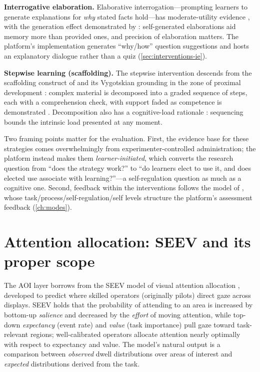 \textbf{Interrogative elaboration.} Elaborative interrogation---prompting
learners to generate explanations for \emph{why} stated facts hold---has
moderate-utility evidence \citep{dunlosky2013}, with the generation effect
demonstrated by \citet{pressley1987}: self-generated elaborations aid
memory more than provided ones, and precision of elaboration matters. The
platform's implementation generates ``why/how'' question suggestions and
hosts an explanatory dialogue rather than a quiz
(\cref{sec:interventions-ie}).

\textbf{Stepwise learning (scaffolding).} The stepwise intervention
descends from the scaffolding construct of \citet{wood1976} and its
Vygotskian grounding in the zone of proximal development
\citep{vygotsky1978}: complex material is decomposed into a graded
sequence of steps, each with a comprehension check, with support faded as
competence is demonstrated \citep{vandepol2010}. Decomposition also has a
cognitive-load rationale \citep{sweller1988}: sequencing bounds the
intrinsic load presented at any moment.

Two framing points matter for the evaluation. First, the evidence base for
these strategies comes overwhelmingly from experimenter-controlled
administration; the platform instead makes them \emph{learner-initiated},
which converts the research question from ``does the strategy work?'' to
``do learners elect to use it, and does elected use associate with
learning?''---a self-regulation question as much as a cognitive one.
Second, feedback within the interventions follows the model of
\citet{hattie2007}, whose task/process/self-regulation/self levels
structure the platform's assessment feedback (\cref{ch:modes}).

\section{Attention allocation: SEEV and its proper scope}
\label{sec:bg-seev}

The AOI layer borrows from the SEEV model of visual attention allocation
\citep{wickens2003, wickens2008}, developed to predict where skilled
operators (originally pilots) direct gaze across displays. SEEV holds that
the probability of attending to an area is increased by bottom-up
\emph{salience} and decreased by the \emph{effort} of moving attention,
while top-down \emph{expectancy} (event rate) and \emph{value} (task
importance) pull gaze toward task-relevant regions; well-calibrated
operators allocate attention nearly optimally with respect to expectancy
and value. The model's natural output is a comparison between
\emph{observed} dwell distributions over areas of interest and
\emph{expected} distributions derived from the task.

